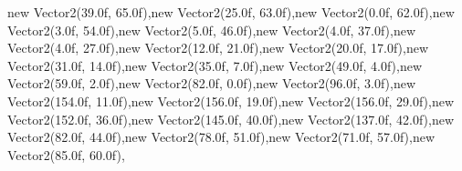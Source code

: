 new Vector2(39.0f, 65.0f),new Vector2(25.0f, 63.0f),new Vector2(0.0f, 62.0f),new Vector2(3.0f, 54.0f),new Vector2(5.0f, 46.0f),new Vector2(4.0f, 37.0f),new Vector2(4.0f, 27.0f),new Vector2(12.0f, 21.0f),new Vector2(20.0f, 17.0f),new Vector2(31.0f, 14.0f),new Vector2(35.0f, 7.0f),new Vector2(49.0f, 4.0f),new Vector2(59.0f, 2.0f),new Vector2(82.0f, 0.0f),new Vector2(96.0f, 3.0f),new Vector2(154.0f, 11.0f),new Vector2(156.0f, 19.0f),new Vector2(156.0f, 29.0f),new Vector2(152.0f, 36.0f),new Vector2(145.0f, 40.0f),new Vector2(137.0f, 42.0f),new Vector2(82.0f, 44.0f),new Vector2(78.0f, 51.0f),new Vector2(71.0f, 57.0f),new Vector2(85.0f, 60.0f),
